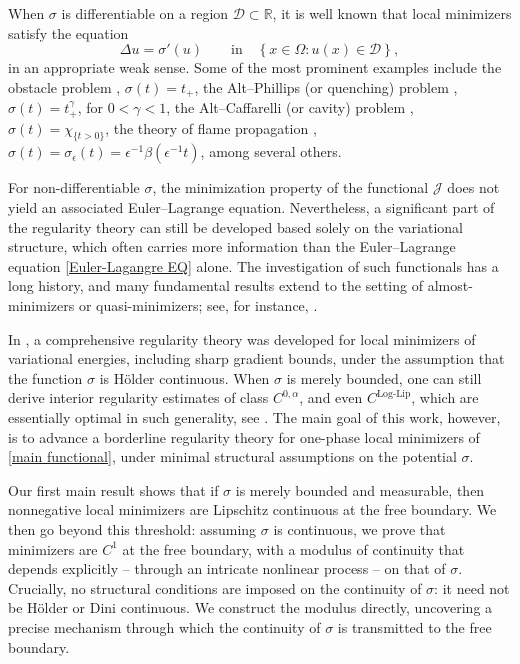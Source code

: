 \documentclass[reqno,11pt]{amsart}
\newcommand{\1}{\mathds{1}}  %
\numberwithin{equation}{section}
\begin{document}
When $\sigma$ is differentiable on a region $\mathcal{D} \subset \mathbb{R}$, it is well known that local minimizers satisfy the equation  
\begin{equation}\label{Euler-Lagangre EQ}
    \Delta u = \sigma'(u) \qquad \text{in} \quad \left\{ x \in \Omega \colon u(x) \in \mathcal{D} \right\},
\end{equation}  
in an appropriate weak sense. Some of the most prominent examples include the obstacle problem \cite{CAF1}, $\sigma(t) = t_{+}$, the Alt--Phillips (or quenching) problem \cite{AP}, $\sigma(t) = t_+^\gamma$, for $0<\gamma < 1$, the Alt--Caffarelli (or cavity) problem \cite{AC}, $\sigma(t) = \chi_{\{t > 0\}}$, the theory of flame propagation \cite{BCN, LW1}, $\sigma(t) = \sigma_\epsilon(t) = \epsilon^{-1} \beta(\epsilon^{-1} t)$, among several others.  

For non-differentiable $\sigma$, the minimization property of the functional $\mathcal{J}$ does not yield an associated Euler--Lagrange equation. Nevertheless, a significant part of the regularity theory can still be developed based solely on the variational structure, which often carries more information than the Euler--Lagrange equation \eqref{Euler-Lagangre EQ} alone. The investigation of such functionals has a long history, and many fundamental results extend to the setting of almost-minimizers or quasi-minimizers; see, for instance, \cite{GG, DT, DSS, DFFV, PT24}. 

In \cite{DeFM}, a comprehensive regularity theory was developed for local minimizers of variational energies, including sharp gradient bounds, under the assumption that the function $\sigma$ is H\"older continuous. When $\sigma$ is merely bounded, one can still derive interior regularity estimates of class $C^{0,\alpha}$, and even $C^{\text{Log-Lip}}$, which are essentially optimal in such generality, see . The main goal of this work, however, is to advance a borderline regularity theory for one-phase local minimizers of \eqref{main functional}, under minimal structural assumptions on the potential $\sigma$.

Our first main result shows that if $\sigma$ is merely bounded and measurable, then nonnegative local minimizers are Lipschitz continuous at the free boundary. We then go beyond this threshold: assuming $\sigma$ is continuous, we prove that minimizers are $C^1$ at the free boundary, with a modulus of continuity that depends explicitly -- through an intricate nonlinear process -- on that of $\sigma$. Crucially, no structural conditions are imposed on the continuity of $\sigma$: it need not be H\"older or Dini continuous. We construct the modulus directly, uncovering a precise mechanism through which the continuity of $\sigma$ is transmitted to the free boundary. 
\end{document}
